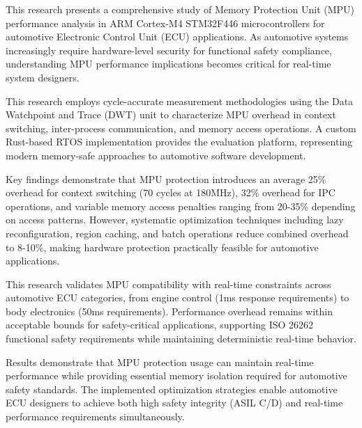 \begin{KoreanAbstract}

This research presents a comprehensive study of Memory Protection Unit (MPU) performance analysis in ARM Cortex-M4 STM32F446 microcontrollers for automotive Electronic Control Unit (ECU) applications. As automotive systems increasingly require hardware-level security for functional safety compliance, understanding MPU performance implications becomes critical for real-time system designers.

This research employs cycle-accurate measurement methodologies using the Data Watchpoint and Trace (DWT) unit to characterize MPU overhead in context switching, inter-process communication, and memory access operations. A custom Rust-based RTOS implementation provides the evaluation platform, representing modern memory-safe approaches to automotive software development.

Key findings demonstrate that MPU protection introduces an average 25\% overhead for context switching (70 cycles at 180MHz), 32\% overhead for IPC operations, and variable memory access penalties ranging from 20-35\% depending on access patterns. However, systematic optimization techniques including lazy reconfiguration, region caching, and batch operations reduce combined overhead to 8-10\%, making hardware protection practically feasible for automotive applications.

This research validates MPU compatibility with real-time constraints across automotive ECU categories, from engine control (1ms response requirements) to body electronics (50ms requirements). Performance overhead remains within acceptable bounds for safety-critical applications, supporting ISO 26262 functional safety requirements while maintaining deterministic real-time behavior.

Results demonstrate that MPU protection usage can maintain real-time performance while providing essential memory isolation required for automotive safety standards. The implemented optimization strategies enable automotive ECU designers to achieve both high safety integrity (ASIL C/D) and real-time performance requirements simultaneously.

\end{KoreanAbstract}